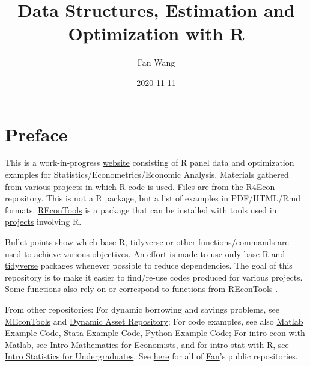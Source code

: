 \documentclass[
]{book}
\title{Data Structures, Estimation and Optimization with R}
\author{Fan Wang}
\date{2020-11-11}
\begin{document}
\maketitle

{
\hypersetup{linkcolor=}
\setcounter{tocdepth}{1}
\tableofcontents
}
\hypertarget{preface}{%
\chapter*{Preface}\label{preface}}

This is a work-in-progress \href{https://fanwangecon.github.io/R4Econ/}{website} consisting of R panel data and optimization examples for Statistics/Econometrics/Economic Analysis. Materials gathered from various \href{https://fanwangecon.github.io/research}{projects} in which R code is used. Files are from the \href{https://github.com/FanWangEcon/R4Econ}{R4Econ} repository. This is not a R package, but a list of examples in PDF/HTML/Rmd formats. \href{https://fanwangecon.github.io/REconTools/}{REconTools} is a package that can be installed with tools used in \href{https://fanwangecon.github.io/research}{projects} involving R.

Bullet points show which \href{https://www.rdocumentation.org/packages/base/versions/3.5.2}{base R}, \href{https://www.tidyverse.org/}{tidyverse} or other functions/commands are used to achieve various objectives. An effort is made to use only \href{https://www.rdocumentation.org/packages/base/versions/3.5.2}{base R} \citep{R-base} and \href{https://www.tidyverse.org/}{tidyverse} \citep{R-tidyverse} packages whenever possible to reduce dependencies. The goal of this repository is to make it easier to find/re-use codes produced for various projects. Some functions also rely on or correspond to functions from \href{https://fanwangecon.github.io/REconTools/}{REconTools} \citep{R-REconTools}.

From other repositories: For dynamic borrowing and savings problems, see \href{https://fanwangecon.github.io/MEconTools/}{MEconTools} and \href{https://fanwangecon.github.io/CodeDynaAsset/}{Dynamic Asset Repository}; For code examples, see also \href{https://fanwangecon.github.io/M4Econ/}{Matlab Example Code}, \href{https://fanwangecon.github.io/Stata4Econ/}{Stata Example Code}, \href{https://fanwangecon.github.io/pyfan/}{Python Example Code}; For intro econ with Matlab, see \href{https://fanwangecon.github.io/Math4Econ/}{Intro Mathematics for Economists}, and for intro stat with R, see \href{https://fanwangecon.github.io/Stat4Econ/}{Intro Statistics for Undergraduates}. See \href{https://github.com/FanWangEcon}{here} for all of \href{https://fanwangecon.github.io/}{Fan}'s public repositories.
\end{document}
